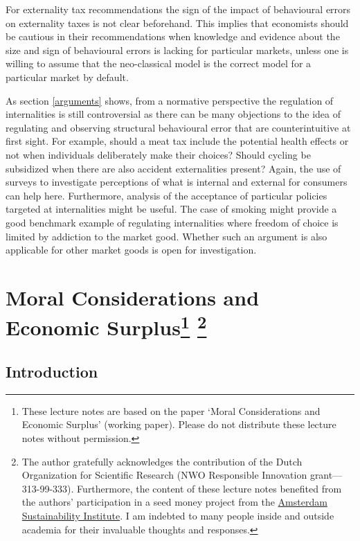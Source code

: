 \documentclass[
]{book}
\begin{document}
For externality tax recommendations the sign of the impact of behavioural errors on externality taxes is not clear beforehand. This implies that economists should be cautious in their recommendations when knowledge and evidence about the size and sign of behavioural errors is lacking for particular markets, unless one is willing to assume that the neo-classical model is the correct model for a particular market by default.

As section \ref{arguments} shows, from a normative perspective the regulation of internalities is still controversial as there can be many objections to the idea of regulating and observing structural behavioural error that are counterintuitive at first sight. For example, should a meat tax include the potential health effects or not when individuals deliberately make their choices? Should cycling be subsidized when there are also accident externalities present? Again, the use of surveys to investigate perceptions of what is internal and external for consumers can help here. Furthermore, analysis of the acceptance of particular policies targeted at internalities might be useful. The case of smoking might provide a good benchmark example of regulating internalities where freedom of choice is limited by addiction to the market good. Whether such an argument is also applicable for other market goods is open for investigation.

\hypertarget{moral}{%
\chapter[Moral Considerations and Economic Surplus ]{\texorpdfstring{Moral Considerations and Economic Surplus\footnote{These lecture notes are based on the paper `Moral Considerations and Economic Surplus' (working paper). Please do not distribute these lecture notes without permission.} \footnote{The author gratefully acknowledges the contribution of the Dutch Organization for Scientific Research (NWO Responsible Innovation grant---313-99-333). Furthermore, the content of these lecture notes benefited from the authors' participation in a seed money project from the \href{https://www.agci.vu.nl/en/}{Amsterdam Sustainability Institute}. I am indebted to many people inside and outside academia for their invaluable thoughts and responses.}}{Moral Considerations and Economic Surplus }}\label{moral}}

\hypertarget{introduction-10}{%
\section{Introduction}\label{introduction-10}}
\end{document}
